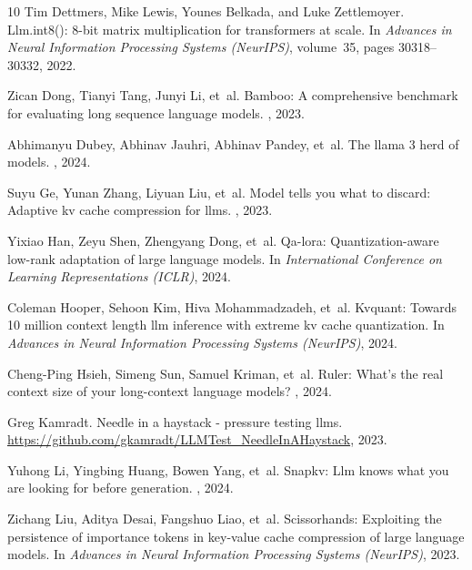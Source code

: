\documentclass[11pt,a4paper]{article}
\begin{document}
\begin{thebibliography}{10}
Tim Dettmers, Mike Lewis, Younes Belkada, and Luke Zettlemoyer.
\newblock Llm.int8(): 8-bit matrix multiplication for transformers at scale.
\newblock In {\em Advances in Neural Information Processing Systems (NeurIPS)}, volume~35, pages 30318--30332, 2022.

Zican Dong, Tianyi Tang, Junyi Li, et~al.
\newblock Bamboo: A comprehensive benchmark for evaluating long sequence language models.
, 2023.

Abhimanyu Dubey, Abhinav Jauhri, Abhinav Pandey, et~al.
\newblock The llama 3 herd of models.
, 2024.

Suyu Ge, Yunan Zhang, Liyuan Liu, et~al.
\newblock Model tells you what to discard: Adaptive kv cache compression for llms.
, 2023.

Yixiao Han, Zeyu Shen, Zhengyang Dong, et~al.
\newblock Qa-lora: Quantization-aware low-rank adaptation of large language models.
\newblock In {\em International Conference on Learning Representations (ICLR)}, 2024.

Coleman Hooper, Sehoon Kim, Hiva Mohammadzadeh, et~al.
\newblock Kvquant: Towards 10 million context length llm inference with extreme kv cache quantization.
\newblock In {\em Advances in Neural Information Processing Systems (NeurIPS)}, 2024.

Cheng-Ping Hsieh, Simeng Sun, Samuel Kriman, et~al.
\newblock Ruler: What's the real context size of your long-context language models?
, 2024.

Greg Kamradt.
\newblock Needle in a haystack - pressure testing llms.
\newblock \url{https://github.com/gkamradt/LLMTest_NeedleInAHaystack}, 2023.

Yuhong Li, Yingbing Huang, Bowen Yang, et~al.
\newblock Snapkv: Llm knows what you are looking for before generation.
, 2024.

Zichang Liu, Aditya Desai, Fangshuo Liao, et~al.
\newblock Scissorhands: Exploiting the persistence of importance tokens in key-value cache compression of large language models.
\newblock In {\em Advances in Neural Information Processing Systems (NeurIPS)}, 2023.


\end{thebibliography}
\end{document}

